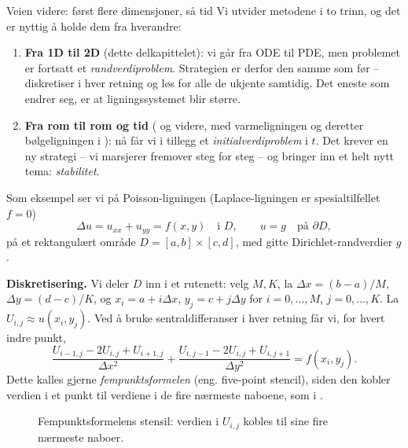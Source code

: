\begin{rem}{Veien videre: først flere dimensjoner, så tid}
Vi utvider metodene i to trinn, og det er nyttig å holde dem fra hverandre:
\begin{enumerate}
\item \textbf{Fra 1D til 2D} (dette delkapittelet): vi går fra ODE til PDE, men problemet er fortsatt et \emph{randverdiproblem}. Strategien er derfor den samme som før -- diskretiser i hver retning og løs for alle de ukjente samtidig. Det eneste som endrer seg, er at ligningssystemet blir større.
\item \textbf{Fra rom til rom og tid} ( og videre, med varmeligningen og deretter bølgeligningen i ): nå får vi i tillegg et \emph{initialverdiproblem} i $t$. Det krever en ny strategi -- vi marsjerer fremover steg for steg -- og bringer inn et helt nytt tema: \emph{stabilitet}.
\end{enumerate}
\end{rem}

Som eksempel ser vi på Poisson-ligningen (Laplace-ligningen er spesialtilfellet $f=0$)
\[
\Delta u = u_{xx}+u_{yy} = f(x,y) \quad \text{i } D, \qquad u=g \quad \text{på } \partial D,
\]
på et rektangulært område $D=[a,b]\times[c,d]$, med gitte Dirichlet-randverdier $g$.

\textbf{Diskretisering.} Vi deler $D$ inn i et rutenett: velg $M,K$, la $\Delta x=(b-a)/M$, $\Delta y=(d-c)/K$, og $x_i=a+i\Delta x$, $y_j=c+j\Delta y$ for $i=0,\ldots,M$, $j=0,\ldots,K$. La $U_{i,j}\approx u(x_i,y_j)$. Ved å bruke sentraldifferanser i hver retning får vi, for hvert indre punkt,
\[
\frac{U_{i-1,j}-2U_{i,j}+U_{i+1,j}}{\Delta x^2} + \frac{U_{i,j-1}-2U_{i,j}+U_{i,j+1}}{\Delta y^2} = f(x_i,y_j).
\]
Dette kalles gjerne \emph{fempunktsformelen} (eng. five-point stencil), siden den kobler verdien i et punkt til verdiene i de fire nærmeste naboene, som i .

\begin{figure}[htbp]
\centering
{}
\caption{Fempunktsformelens stensil: verdien i $U_{i,j}$ kobles til sine fire nærmeste naboer.}\label{fig:fempunkt_stensil}
\end{figure}

